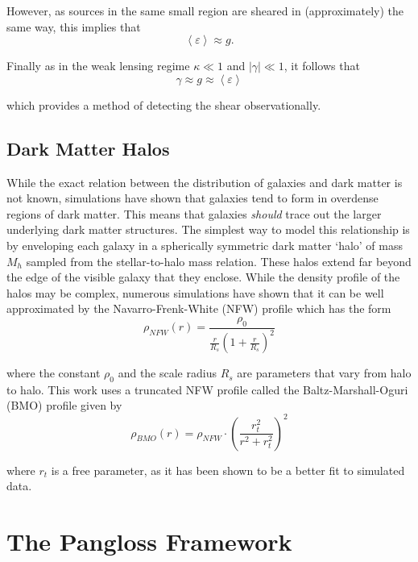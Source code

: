 \documentclass[%
 reprint,
 amsmath,amssymb,
 aps,
]{revtex4-1}
\begin{document}
\noindent However, as sources in the same small region are sheared in (approximately) the same way, this implies that
\begin{equation}
\left<\varepsilon\right>\approx g.
\end{equation}

 \noindent Finally as in the weak lensing regime ${\kappa\ll1}$ and ${|\gamma|\ll1}$, it follows that
 \begin{equation}
 \gamma\approx g\approx\left<\varepsilon\right>
 \end{equation}

 \noindent which provides a method of detecting the shear observationally.

\subsection*{Dark Matter Halos}

While the exact relation between the distribution of galaxies and dark matter is not known, simulations have shown that galaxies tend to form in overdense regions of dark matter. This means that galaxies \textit{should} trace out the larger underlying dark matter structures. The simplest way to model this relationship is by enveloping each galaxy in a spherically symmetric dark matter `halo' of mass $M_h$ sampled from the stellar-to-halo mass relation\cite{smhr}. These halos extend far beyond the edge of the visible galaxy that they enclose. While the density profile of the halos may be complex, numerous simulations have shown that it can be well approximated by the Navarro-Frenk-White (NFW) profile which has the form
\begin{equation}\label{nfw_profile}
\rho_{NFW}(r)=\frac{\rho_0}{\frac{r}{R_s}\left(1+\frac{r}{R_s}\right)^2}
\end{equation}

\noindent where the constant $\rho_0$ and the scale radius $R_s$ are parameters that vary from halo to halo\cite{nfw}. This work uses a truncated NFW profile called the Baltz-Marshall-Oguri (BMO) profile given by
\begin{equation}\label{bmo_profile}
\rho_{BMO}(r)=\rho_{NFW}\cdot\left(\frac{r_t^2}{r^2+r_t^2}\right)^2
\end{equation}

\noindent where $r_t$ is a free parameter, as it has been shown to be a better fit to simulated data\cite{nfw_bmo}.

\section{The Pangloss Framework}
\end{document}
